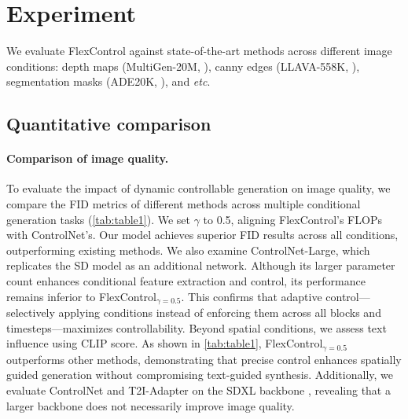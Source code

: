 \section{Experiment}

We evaluate FlexControl against state-of-the-art methods across different image conditions: depth maps (MultiGen-20M, \cite{zhao2024uni}), canny edges (LLAVA-558K, \cite{liu2024visual}), segmentation masks (ADE20K, \cite{zhou2017scene}), and \textit{etc}.

\subsection{Quantitative comparison}

\paragraph{Comparison of image quality.}

To evaluate the impact of dynamic controllable generation on image quality, we compare the FID metrics of different methods across multiple conditional generation tasks (\cref{tab:table1}). We set $\gamma$ to 0.5, aligning FlexControl’s FLOPs with ControlNet’s. Our model achieves superior FID results across all conditions, outperforming existing methods. We also examine ControlNet-Large, which replicates the SD model as an additional network. Although its larger parameter count enhances conditional feature extraction and control, its performance remains inferior to FlexControl$_{\gamma=0.5}$. This confirms that adaptive control—selectively applying conditions instead of enforcing them across all blocks and timesteps—maximizes controllability. Beyond spatial conditions, we assess text influence using CLIP score. As shown in \cref{tab:table1}, FlexControl$_{\gamma=0.5}$ outperforms other methods, demonstrating that precise control enhances spatially guided generation without compromising text-guided synthesis. Additionally, we evaluate ControlNet and T2I-Adapter on the SDXL backbone \cite{podell2023sdxl}, revealing that a larger backbone does not necessarily improve image quality.

